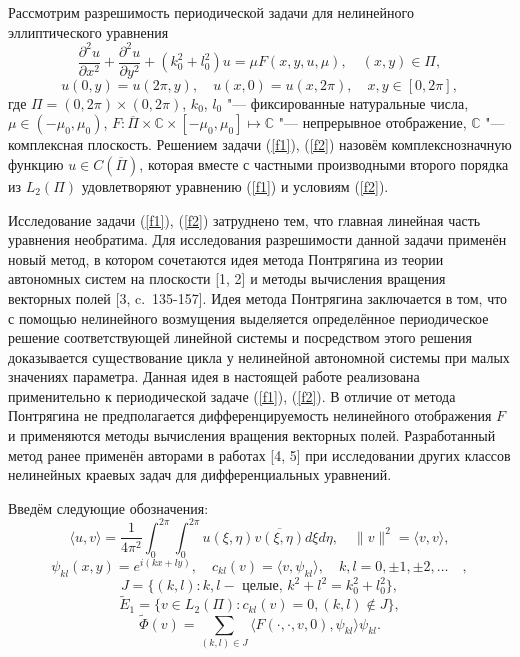 
\vzmscaption

Рассмотрим разрешимость периодической задачи для нелинейного
эллиптического уравнения
\begin{equation}\label{f1}
\frac{\partial^2u}{\partial x^2}+\frac{\partial^2u}{\partial
y^2}+(k_0^2+l_0^2)u=\mu F(x,y,u,\mu), \quad (x, y)\in \Pi,
\end{equation}
\begin{equation}\label{f2}
u(0,y)=u(2\pi ,y), \quad u(x,0)=u(x,2\pi), \quad x, y\in [0,
2\pi],
\end{equation}
где $\Pi=(0,2\pi)\times (0,2\pi)$, $k_0$, $l_0$ "--- фиксированные натуральные числа, $\mu\in
(-\mu_0, \mu_0)$, $F : \overline{\Pi}\times \mathbb{C}\times
[-\mu_0, \mu_0]\mapsto \mathbb{C}$ "--- непрерывное отображение,
$\mathbb{C}$ "--- комплексная плоскость. Решением задачи (\ref{f1}),
(\ref{f2}) назовём комплекснозначную функцию $u\in
C(\overline{\Pi})$, которая вместе с частными производными второго
порядка из $L_2(\Pi)$ удовлетворяют уравнению (\ref{f1}) и
условиям (\ref{f2}).

Исследование задачи (\ref{f1}), (\ref{f2}) затруднено тем, что
главная линейная часть уравнения необратима. Для исследования
разрешимости данной задачи применён новый метод, в котором
сочетаются идея метода Понтрягина из теории автономных систем на
плоскости [1, 2] и методы вычисления вращения векторных полей [3, c.~135-157].
Идея метода Понтрягина заключается
в том, что с помощью нелинейного возмущения выделяется
определённое периодическое решение соответствующей линейной
системы и посредством этого решения доказывается существование
цикла у нелинейной автономной системы при малых значениях
параметра. Данная идея в настоящей работе реализована
применительно к периодической задаче (\ref{f1}), (\ref{f2}). В
отличие от метода Понтрягина не предполагается дифференцируемость
нелинейного отображения $F$ и применяются методы вычисления
вращения векторных полей.
Разработанный метод ранее применён авторами в работах [4, 5]
при исследовании других классов нелинейных краевых
задач для дифференциальных уравнений.

Введём следующие обозначения:
$$
\langle u , v \rangle =
\frac{1}{4\pi^2}\int_0^{2\pi}\int_0^{2\pi}u(\xi,\eta)\overline{v(\xi,\eta)}d\xi
d\eta, \quad \|v\|^2=\langle v , v \rangle,
$$
$$
\psi_{kl}(x,y)=e^{i(kx+ly)}, \quad c_{kl}(v)=\langle v , \psi_{kl}\rangle,
\quad k, l = 0, \pm 1, \pm 2, \ldots \quad ,
$$
$$
J=\{(k,l): k, l - \mbox{ целые, } k^2+l^2=k_0^2+l_0^2 \},
$$
$$
\widetilde{E}_1=\{ v\in L_2(\Pi):  c_{kl}(v)=0, (k,l)\not\in J \},
$$
$$
\widetilde{\Phi}(v)=\sum_{(k,l)\in
J}\langle F(\cdot,\cdot,v,0),\psi_{kl}\rangle\psi_{kl}.
$$

